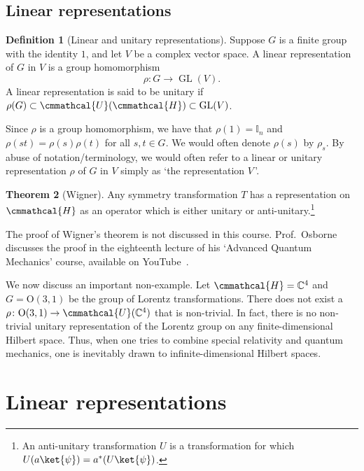 \documentclass[a4 paper, 12pt]{book}
\renewcommand{\mathcal}{\cmmathcal}
\theoremstyle{definition}
\newtheorem{theorem}{Theorem}[section]
\newtheorem{definition}[theorem]{Definition}
\newcommand{\cc}{\mathbb{C}}
\newcommand{\ii}{\mathbb{I}}
\DeclareMathOperator{\GL}{GL}
\newcommand{\hilbert}{\mathcal{H}}
\newcommand{\unitary}{\mathcal{U}}
\newcommand{\ortho}{\mathrm{O}}
\newcommand{\lorentz}{\ortho{(3,1)}}
\begin{document}
	\section{Linear representations}

	\begin{definition}[Linear and unitary representations]
		Suppose \(G\) is a finite group with the identity \(1\), and let \(V\) be a complex vector space. A linear representation of \(G\) in \(V\) is a group homomorphism
		\begin{equation*}
		    \rho \colon G \rightarrow \GL(V).
		\end{equation*}
		A linear representation is said to be unitary if \(\rho(G) \subset \unitary(\hilbert) \subset \GL(V)\).
	\end{definition}
	\noindent Since \(\rho\) is a group homomorphism, we have that \(\rho(1) = \ii_n\) and \(\rho(st) = \rho(s) \rho(t)\) for all \(s, t \in G\). We would often denote \(\rho(s)\) by \(\rho_s\). By abuse of notation/terminology, we would often refer to a linear or unitary representation \(\rho\) of \(G\) in \(V\) simply as `the representation \(V\)\,'.
	\begin{theorem}[Wigner]
		Any symmetry transformation \(T\) has a representation on \(\hilbert\) as an operator which is either unitary or anti-unitary.\footnote{An anti-unitary transformation \(U\) is a transformation for which \(U(a\ket{\psi}) = a^*(U\ket{\psi})\).}
	\end{theorem}
	The proof of Wigner's theorem is not discussed in this course. Prof.\ Osborne discusses the proof in the eighteenth lecture of his `Advanced Quantum Mechanics' course, available on YouTube~\cite{Osborne_wigner}.

	We now discuss an important non-example. Let \(\hilbert = \cc^4\) and \(G = \lorentz\) be the group of Lorentz transformations. There does not exist a \(\rho \colon \lorentz \rightarrow \unitary(\cc^4)\) that is non-trivial. In fact, there is no non-trivial unitary representation of the Lorentz group on any finite-dimensional Hilbert space. Thus, when one tries to combine special relativity and quantum mechanics, one is inevitably drawn to infinite-dimensional Hilbert spaces.

	\chapter{Linear representations}
	\chaptermark{}
\end{document}
